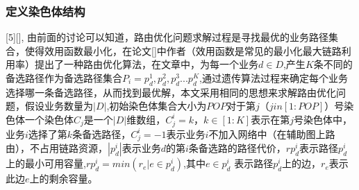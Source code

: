 \subsubsection{定义染色体结构}
[5][],
由前面的讨论可以知道，路由优化问题求解过程是寻找最优的业务路径集合，使得效用函数最小化，在论文[]中作者（效用函数是常见的最小化最大链路利用率）提出了一种路由优化算法，在文章中，为每一个业务$d \in D$,产生$K$条不同的备选路径作为备选路径集合$P_i={p^1_d,p^2_d,p^3_d...p^K_d}$,通过遗传算法过程来确定每个业务选择哪一条备选路径，从而找到最优解，本文采用相同的思想来求解路由优化问题，假设业务数量为$|D|$,初始染色体集合大小为$POP$对于第$j$（$j in [1:POP]$）号染色体一个染色体$C_j$是一个$|D|$维数组，$C^i_j=k，k \in[1:K]$表示在第$j$号染色体中，业务$i$选择了第$k$条备选路径，$C^i_j=-1$表示业务$i$不加入网络中（在辅助图上路由），不占用链路资源，$|p^i_d|$表示业务$d$的第$i$条备选路的路径代价，$rp^i_d$表示路径$p^i_d$上的最小可用容量,$rp^i_d=min(r_e|e \in p^i_d)$,其中$e \in p^i_d$ 表示路径$p^i_d$上的边，$r_e$表示此边$e$上的剩余容量。
